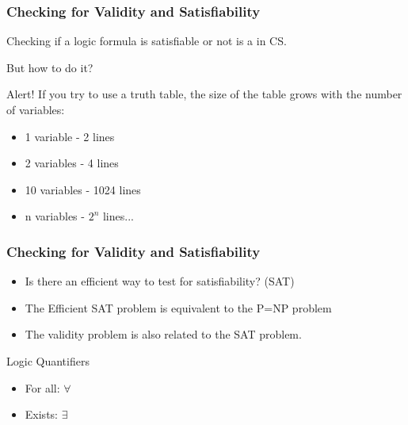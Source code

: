 \begin{frame}
  \frametitle{Checking for Validity and Satisfiability}

  Checking if a logic formula is satisfiable or not is a
   in CS.

  \bigskip

  But how to do it?

  \bigskip

  \alert{Alert!} If you try to use a truth table, the size of the
  table grows with the number of variables:
  \begin{itemize}
  \item 1 variable - 2 lines
  \item 2 variables - 4 lines
  \item 10 variables - 1024 lines
  \item n variables - $2^n$ lines...
  \end{itemize}
\end{frame}

\begin{frame}
  \frametitle{Checking for Validity and Satisfiability}
  \begin{itemize}
  \item Is there an efficient way to test for satisfiability? (SAT)
    \bigskip

  \item The Efficient SAT problem is equivalent to the P=NP problem
    \bigskip

  \item The validity problem is also related to the SAT problem.
  \end{itemize}
\end{frame}

\begin{frame}
  \begin{center}
    Logic Quantifiers
  \end{center}

  \bigskip
  \begin{itemize}
  \item For all: $\forall$
  \item Exists: $\exists$
  \end{itemize}
\end{frame}

